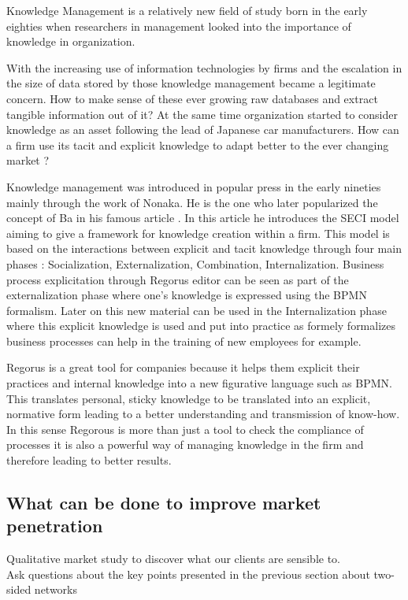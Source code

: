 \documentclass[10pt]{article}
\begin{document}
Knowledge Management is a relatively new field of study born in the early eighties when researchers in management looked into the importance of knowledge in organization.\autocite{Wiig19971}

With the increasing use of information technologies by firms and the escalation in the size of data stored by those knowledge management became a legitimate concern. How to make sense of these ever growing raw databases and extract tangible information out of it? At the same time organization started to consider knowledge as an asset following the lead of Japanese car manufacturers.\autocite{Koenig08} How can a firm use its tacit and explicit knowledge to adapt better to the ever changing market ?

Knowledge management was introduced in popular press in the early nineties mainly through the work of Nonaka. \autocite{nonaka1991knowledge} He is the one who later popularized the concept of Ba in his famous article \autocite{Nonaka_Konno_1998}. In this article he introduces the SECI model aiming to give a framework for knowledge creation within a firm. This model is based on the interactions between explicit and tacit knowledge through four main phases : Socialization, Externalization, Combination, Internalization. Business process explicitation through Regorus editor can be seen as part of the externalization phase where one's knowledge is expressed using the BPMN formalism. Later on this new material can be used in the Internalization phase where this explicit knowledge is used and put into practice as formely formalizes business processes can help in the training of new employees for example.

Regorus is a great tool for companies because it helps them explicit their practices and internal knowledge into a new figurative language such as BPMN. This translates personal, sticky knowledge to be translated into an explicit, normative form leading to a better understanding and transmission of know-how. In this sense Regorous is more than just a tool to check the compliance of processes it is also a powerful way of managing knowledge in the firm and therefore leading to better results.

\subsection{What can be done to improve market penetration}
Qualitative market study to discover what our clients are sensible to.\\
Ask questions about the key points presented in the previous section about two-sided networks
\end{document}
